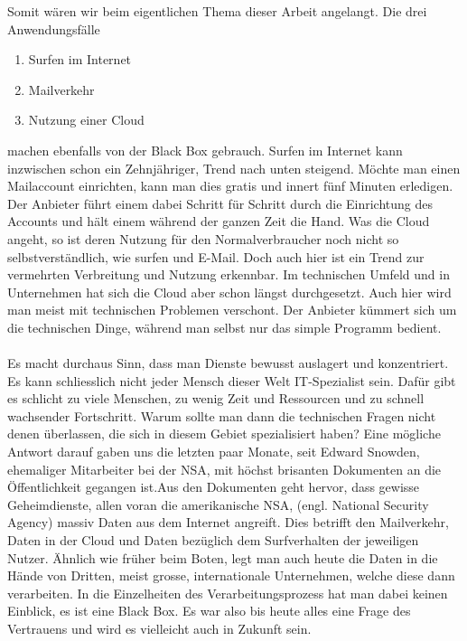 Somit wären wir beim eigentlichen Thema dieser Arbeit angelangt. Die drei Anwendungsfälle

\begin{enumerate}
\item Surfen im Internet
\item Mailverkehr
\item Nutzung einer Cloud
\end{enumerate}

machen ebenfalls von der Black Box gebrauch. Surfen im Internet kann inzwischen schon ein Zehnjähriger, Trend nach unten steigend. Möchte man einen Mailaccount einrichten, kann man dies gratis und innert fünf Minuten erledigen. Der Anbieter führt einem dabei Schritt für Schritt durch die Einrichtung des Accounts und hält einem während der ganzen Zeit die Hand. Was die Cloud angeht, so ist deren Nutzung für den Normalverbraucher noch nicht so selbstverständlich, wie surfen und E-Mail. Doch auch hier ist ein Trend zur vermehrten Verbreitung und Nutzung erkennbar. Im technischen Umfeld und in Unternehmen hat sich die Cloud aber schon längst durchgesetzt. Auch hier wird man meist mit technischen Problemen verschont. Der Anbieter kümmert sich um die technischen Dinge, während man selbst nur das simple Programm bedient.
\\
\\
Es macht durchaus Sinn, dass man Dienste bewusst auslagert und konzentriert. Es kann schliesslich nicht jeder Mensch dieser Welt IT-Spezialist sein. Dafür gibt es schlicht zu viele Menschen, zu wenig Zeit und Ressourcen und zu schnell wachsender Fortschritt. Warum sollte man dann die technischen Fragen nicht denen überlassen, die sich in diesem Gebiet spezialisiert haben? Eine mögliche Antwort darauf gaben uns die letzten paar Monate, seit Edward Snowden, ehemaliger Mitarbeiter bei der NSA, mit höchst brisanten Dokumenten an die Öffentlichkeit gegangen ist.Aus den Dokumenten geht hervor, dass gewisse Geheimdienste, allen voran die amerikanische NSA, (engl. National Security Agency) massiv Daten aus dem Internet angreift. Dies betrifft den Mailverkehr, Daten in der Cloud und Daten bezüglich dem Surfverhalten der jeweiligen Nutzer. Ähnlich wie früher beim Boten, legt man auch heute die Daten in die Hände von Dritten, meist grosse, internationale Unternehmen, welche diese dann verarbeiten. In die Einzelheiten des Verarbeitungsprozess hat man dabei keinen Einblick, es ist eine Black Box. Es war also bis heute alles eine Frage des Vertrauens und wird es vielleicht auch in Zukunft sein.
\\
